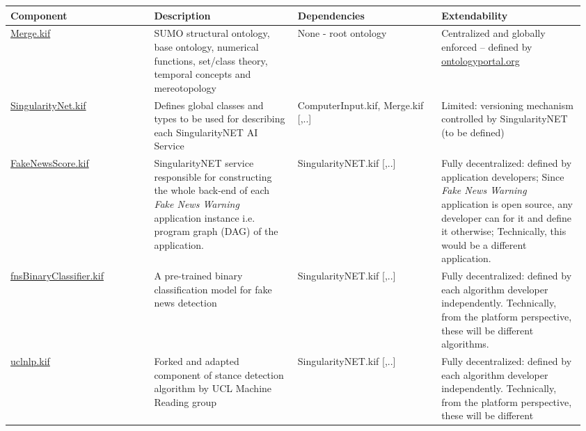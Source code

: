 \documentclass[]{report}
\begin{document}
\begin{table}[H]
  \scriptsize
  \centering
  \begin{tabular}{p{0.24\linewidth}|p{0.24\linewidth}|p{0.24\linewidth}|p{0.24\linewidth}|}
    \textbf{Component} &
    \textbf{Description} &
    \textbf{Dependencies} &
    \textbf{Extendability}\\
    \hline
    \href{https://github.com/ontologyportal/sumo/blob/master/Merge.kif}{Merge.kif} &
    SUMO structural ontology, base ontology, numerical functions, set/class theory, temporal concepts and mereotopology &
    None - root ontology &
    Centralized and globally enforced -- defined by \href{http://www.ontologyportal.org/}{ontologyportal.org} \\
    \hline
    \href{https://github.com/singnet/ai-dsl/blob/master/ontology/
    SingulairtyNet.kif}{SingularityNet.kif} &
    Defines global classes and types to be used for describing each
    SingularityNET AI Service &
    ComputerInput.kif, Merge.kif [,..]&
    Limited: versioning mechanism controlled by SingularityNET (to be defined)\\
    \hline
    \href{https://github.com/singnet/ai-dsl/blob/master/ontology/
    FakeNewsScore.kif}{FakeNewsScore.kif} &
    SingularityNET service responsible for constructing the whole back-end of
    each \textit{Fake News Warning} application instance i.e. program graph
    (DAG) of the application.&
    SingularityNET.kif [,..] &
    Fully decentralized: defined by application developers; Since \textit{Fake News
Warning} application is open source, any developer can for it and define it
otherwise; Technically, this would be a different application.\\
    \hline
    \href{https://github.com/singnet/ai-dsl/blob/master/ontology/fnsBinaryClassifier.kif}{fnsBinaryClassifier.kif} &
    A pre-trained binary classification model for fake news detection &
    SingularityNET.kif [,..] &
    Fully decentralized: defined by each algorithm developer independently.
    Technically, from the platform perspective, these will be different
    algorithms. \\
    \hline
    \href{https://github.com/singnet/ai-dsl/blob/master/ontology/
    uclnlp.kif}{uclnlp.kif} &
    Forked and adapted component of stance detection algorithm by UCL Machine Reading group &
    SingularityNET.kif [,..] &
    Fully decentralized: defined by each algorithm developer independently.
    Technically, from the platform perspective, these will be different

\end{tabular}
\end{table}
\end{document}
